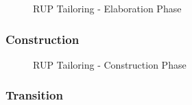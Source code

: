 \documentclass[12pt]{article} %
\begin{document}
	\begin{figure}[H] %
		\caption{RUP Tailoring - Elaboration Phase}
		\label{fig:speciation}
	\end{figure}
	
	\newpage
	
	\subsubsection{Construction}
	
		\begin{figure}[H] %
			\caption{RUP Tailoring - Construction Phase}
			\label{fig:speciation}
		\end{figure}
		
		\newpage
	
	\subsubsection{Transition}
	
\end{document}
